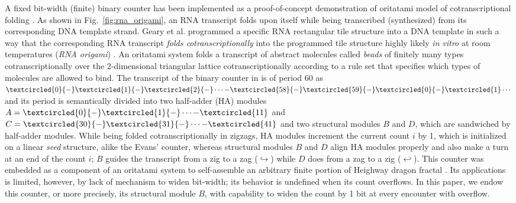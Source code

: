 \documentclass[runningheads]{llncs}
\begin{document}
A fixed bit-width (finite) binary counter has been implemented as a proof-of-concept demonstration of oritatami model of cotranscriptional folding \cite{GeMeScSe2019}. 
As shown in Fig.~\ref{fig:rna_origami}, an RNA transcript folds upon itself while being transcribed (synthesized) from its corresponding DNA template strand. 
Geary et al. programmed a specific RNA rectangular tile structure into a DNA template in such a way that the corresponding RNA transcript \textit{folds cotranscriptionally} into the programmed tile structure highly likely \textit{in vitro} at room temperatures (\textit{RNA origami}) \cite{GearyRothemundAndersen2014}. 
An oritatami system folds a transcript of abstract molecules called \textit{beads} of finitely many types cotranscriptionally over the 2-dimensional triangular lattice cotranscriptionally according to a rule set that specifies which types of molecules are allowed to bind. 
The transcript of the binary counter in \cite{GeMeScSe2019} is of period 60 as $\textcircled{\scriptsize 0}{-}\textcircled{\scriptsize 1}{-}\textcircled{\scriptsize 2}{-} \cdots {-}\textcircled{\scriptsize 58}{-}\textcircled{\scriptsize 59}{-}\textcircled{\scriptsize 0}{-}\textcircled{\scriptsize 1} \cdots$ and its period is semantically divided into two half-adder (HA) modules $A = \textcircled{\scriptsize 0}{-}\textcircled{\scriptsize 1}{-} \cdots {-}\textcircled{\scriptsize 11}$ and $C = \textcircled{\scriptsize 30}{-}\textcircled{\scriptsize 31}{-} \cdots {-}\textcircled{\scriptsize 41}$ and two structural modules $B$ and $D$, which are sandwiched by half-adder modules.
While being folded cotranscriptionally in zigzags, HA modules increment the current count $i$ by 1, which is initialized on a linear \textit{seed} structure, alike the Evans' counter, whereas structural modules $B$ and $D$ align HA modules properly and also make a turn at an end of the count $i$; $B$ guides the transcript from a zig to a zag ($\hookrightarrow$) while $D$ does from a zag to a zig ($\hookleftarrow$). 
This counter was embedded as a component of an oritatami system to self-assemble an arbitrary finite portion of Heighway dragon fractal \cite{MasudaSekiUbukata2018}. 
Its applications is limited, however, by lack of mechanism to widen bit-width; its behavior is undefined when its count overflows. 
In this paper, we endow this counter, or more precisely, its structural module $B$, with capability to widen the count by 1 bit at every encounter with overflow. 
\end{document}
